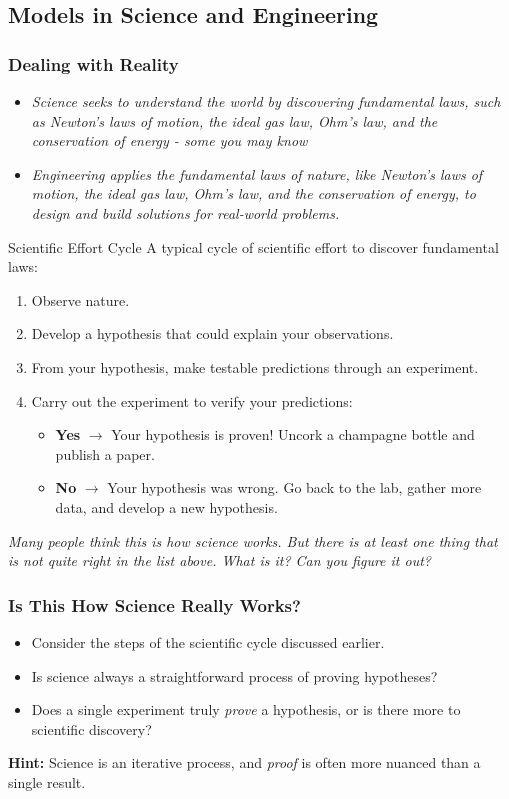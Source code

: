 \documentclass{beamer}
\begin{document}
\subsection{Models in Science and Engineering}
%
\begin{frame}
\frametitle{Dealing with Reality}
\begin{itemize}
\item \emph{Science seeks to understand the world by discovering fundamental laws, such as Newton's laws of motion, the ideal gas law, Ohm's law, and the conservation of energy - some you may know}
\item  \emph{Engineering applies the fundamental laws of nature, like Newton's laws of motion, the ideal gas law, Ohm's law, and the conservation of energy, to design and build solutions for real-world problems.}
\end{itemize}
\end{frame}
%
\begin{frame}{Scientific Effort Cycle}
    A typical cycle of scientific effort to discover fundamental laws:
    \begin{enumerate}
        \item Observe nature.
        \item Develop a hypothesis that could explain your observations.
        \item From your hypothesis, make testable predictions through an experiment.
        \item Carry out the experiment to verify your predictions:
        \begin{itemize}
            \item \textbf{Yes} $\rightarrow$ Your hypothesis is proven! Uncork a champagne bottle and publish a paper.
            \item \textbf{No} $\rightarrow$ Your hypothesis was wrong. Go back to the lab, gather more data, and develop a new hypothesis.
        \end{itemize}
    \end{enumerate}
%
\emph{Many people think this is how science works. But there is at least one thing that is not quite right in the list above. What is it? Can you figure it out?}
%
\end{frame}
%
\begin{frame}
\frametitle{Is This How Science Really Works?}
%
\begin{itemize}
    \item Consider the steps of the scientific cycle discussed earlier.
    \item Is science always a straightforward process of proving hypotheses?
    \item Does a single experiment truly \emph{prove} a hypothesis, or is there more to scientific discovery?
\end{itemize}
%
\pause
\textbf{Hint:} Science is an iterative process, and \emph{proof} is often more nuanced than a single result.
\end{frame}
\end{document}
